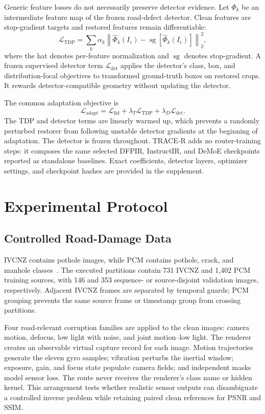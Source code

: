 \documentclass[journal]{IEEEtran}
\begin{document}
Generic feature losses do not necessarily preserve detector evidence. Let $\Phi_k$ be an intermediate feature map of the frozen road-defect detector. Clean features are stop-gradient targets and restored features remain differentiable:
\begin{equation}
\mathcal{L}_{\mathrm{TDP}}
=\sum_k\alpha_k
\left\|\widehat{\Phi}_k(I_r)-
\operatorname{sg}\!\left[\widehat{\Phi}_k(I_c)\right]\right\|_2^2,
\label{eq:tdp}
\end{equation}
where the hat denotes per-feature normalization and $\operatorname{sg}$ denotes stop-gradient. A frozen supervised detector term $\mathcal{L}_{\mathrm{det}}$ applies the detector's class, box, and distribution-focal objectives to transformed ground-truth boxes on restored crops. It rewards detector-compatible geometry without updating the detector.

The common adaptation objective is
\begin{equation}
\mathcal{L}_{\mathrm{adapt}}
=\mathcal{L}_{\mathrm{fid}}
+\lambda_T\mathcal{L}_{\mathrm{TDP}}
+\lambda_D\mathcal{L}_{\mathrm{det}}.
\label{eq:loss}
\end{equation}
The TDP and detector terms are linearly warmed up, which prevents a randomly perturbed restorer from following unstable detector gradients at the beginning of adaptation. The detector is frozen throughout. TRACE-R adds no router-training steps: it composes the same selected DFPIR, InstructIR, and DeMoE checkpoints reported as standalone baselines. Exact coefficients, detector layers, optimizer settings, and checkpoint hashes are provided in the supplement.

\section{Experimental Protocol}
\subsection{Controlled Road-Damage Data}
IVCNZ contains pothole images, while PCM contains pothole, crack, and manhole classes~\cite{giordani2025roadpcm}. The executed partitions contain 731 IVCNZ and 1,402 PCM training sources, with 146 and 353 sequence- or source-disjoint validation images, respectively. Adjacent IVCNZ frames are separated by temporal guards; PCM grouping prevents the same source frame or timestamp group from crossing partitions.

Four road-relevant corruption families are applied to the clean images: camera motion, defocus, low light with noise, and joint motion--low light. The renderer creates an observable virtual capture record for each image. Motion trajectories generate the eleven gyro samples; vibration perturbs the inertial window; exposure, gain, and focus state populate camera fields; and independent masks model sensor loss. The route never receives the renderer's class name or hidden kernel. This arrangement tests whether realistic sensor outputs can disambiguate a controlled inverse problem while retaining paired clean references for PSNR and SSIM.
\end{document}
